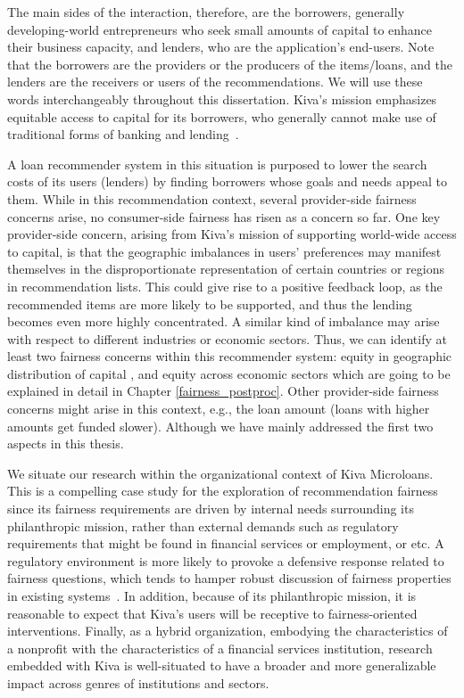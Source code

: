     The main sides of the interaction, therefore, are the borrowers, generally developing-world entrepreneurs who seek small amounts of capital to enhance their business capacity, and lenders, who are the application's end-users. Note that the borrowers are the providers or the producers of the items/loans, and the lenders are the receivers or users of the recommendations. We will use these words interchangeably throughout this dissertation. Kiva's mission emphasizes equitable access to capital for its borrowers, who generally cannot make use of traditional forms of banking and lending~\cite{Choo_understanding_kiva}.
    
    
    A loan recommender system in this situation is purposed to lower the search costs of its users (lenders) by finding borrowers whose goals and needs appeal to them. While in this recommendation context, several provider-side fairness concerns arise, no consumer-side fairness has risen as a concern so far. 
    One key provider-side concern, arising from Kiva's mission of supporting world-wide access to capital, is that the geographic imbalances in users' preferences may manifest themselves in the disproportionate representation of certain countries or regions in recommendation lists. This could give rise to a positive feedback loop, as the recommended items are more likely to be supported, and thus the lending becomes even more highly concentrated. A similar kind of imbalance may arise with respect to different industries or economic sectors. Thus, we can identify at least two fairness concerns within this recommender system: equity in geographic distribution of capital \cite{liu2019personalized}, and equity across economic sectors \cite{Sonboli202Oofair} which are going to be explained in detail in Chapter \ref{fairness_postproc}. Other provider-side fairness concerns might arise in this context, e.g., the loan amount (loans with higher amounts get funded slower). Although we have mainly addressed the first two aspects in this thesis.
    
    
    We situate our research within the organizational context of Kiva Microloans. This is a compelling case study for the exploration of recommendation fairness since its fairness requirements are driven by internal needs surrounding its philanthropic mission, rather than external demands such as regulatory requirements that might be found in financial services or employment, or etc. A regulatory environment is more likely to provoke a defensive response related to fairness questions, which tends to hamper robust discussion of fairness properties in existing systems~\cite{chen2018fair,holstein2019improving}. In addition, because of its philanthropic mission, it is reasonable to expect that Kiva's users will be receptive to fairness-oriented interventions. Finally, as a hybrid organization, embodying the characteristics of a nonprofit with the characteristics of a financial services institution, research embedded with Kiva is well-situated to have a broader and more generalizable impact across genres of institutions and sectors.

